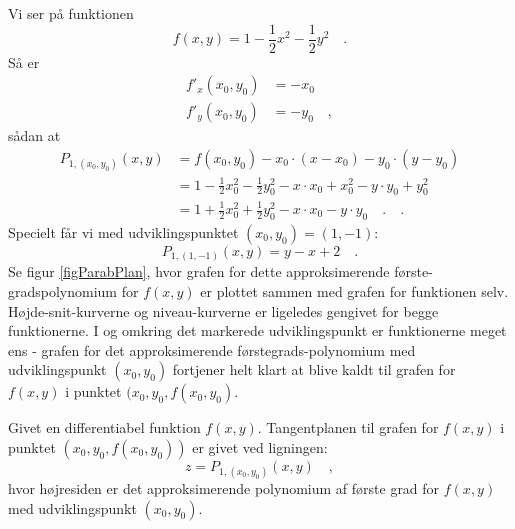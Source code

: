 \begin{example}
Vi ser på funktionen
\begin{equation}
f(x,y) = 1 - \frac{1}{2}x^{2} - \frac{1}{2}y^{2} \quad.
\end{equation}
Så er
\begin{equation}
\begin{aligned}
f'_{x}(x_{0}, y_{0}) &= -x_{0}\\
f'_{y}(x_{0}, y_{0}) &= - y_{0} \quad,
\end{aligned}
\end{equation}
sådan at
\begin{equation}
\begin{aligned}
P_{1, (x_{0}, y_{0})}(x,y) &=  f(x_{0}, y_{0}) - x_{0}\cdot(x-x_{0}) - y_{0}\cdot (y-y_{0}) \\
&= 1 - \frac{1}{2}x_{0}^{2} - \frac{1}{2}y_{0}^{2} - x\cdot x_{0} + x_{0}^{2} - y\cdot y_{0} + y_{0}^{2} \\
&= 1 + \frac{1}{2}x_{0}^{2} + \frac{1}{2}y_{0}^{2} - x\cdot x_{0} - y\cdot y_{0} \quad .
\quad.
\end{aligned}
\end{equation}
Specielt får vi med udviklingspunktet $(x_{0}, y_{0}) = (1, -1)$:
\begin{equation}
P_{1, (1, -1)}(x,y) = y - x + 2 \quad .
\end{equation}
Se figur \ref{figParabPlan}, hvor grafen for dette approksimerende første-gradspolynomium for $f(x,y)$ er plottet sammen med grafen for
funktionen selv. Højde-snit-kurverne og niveau-kurverne er ligeledes gengivet for begge funktionerne. I og omkring det markerede udviklingspunkt er funktionerne
meget ens - grafen for det approksimerende førstegrads-polynomium med udviklingspunkt $(x_{0}, y_{0})$ fortjener helt klart at blive kaldt  til grafen for $f(x,y)$ i punktet $(x_{0}, y_{0}, f(x_{0}, y_{0})$.
\end{example}

\begin{definition}
Givet en differentiabel funktion $f(x,y)$. Tangentplanen til grafen for $f(x,y)$ i punktet $(x_{0}, y_{0}, f(x_{0}, y_{0}))$ er givet ved ligningen:
\begin{equation}
z = P_{1, (x_{0}, y_{0})}(x,y) \quad,
\end{equation}
hvor højresiden er det approksimerende polynomium af første grad for $f(x,y)$ med udviklingspunkt $(x_{0}, y_{0})$.
\end{definition}



